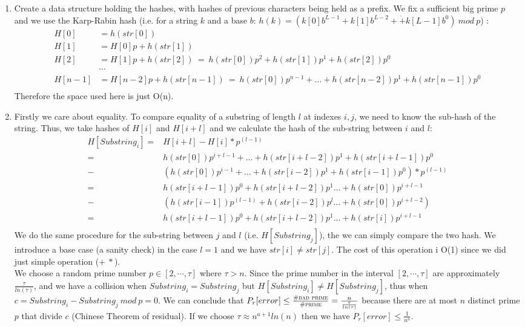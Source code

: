 \documentclass[a4paper]{article}
\begin{document}
\begin{enumerate}
\item Create a data structure holding the hashes, with hashes of previous characters being held as a prefix. We fix a sufficient big prime $p$ and we use the Karp-Rabin hash (i.e. for a string $k$ and a base $b$: $h(k) = (k[0]b^{L−1} + k[1]b^{L−2}+ \dot+ k [L − 1]b^0) \ mod\  p $) :
\begin{align*}
        H[0]&   = h(str[0]) \\
        H[1]&   = H[0]  p + h(str[1])\\
        H[2]&   = H[1]  p + h(str[2]) \ = \ h(str[0]) p^2 + h(str[1]) p^1 +h(str[2])p^0\\
        &\cdots  \\
        H[n-1]& = H[n-2]  p + h(str[n-1]) \ = \  h(str[0]) p^{n-1} +  \dots  +h(str[n-2]) p^1 + h(str[n-1])p^0\\ 
\end{align*}
Therefore the space used here is just O(n).
\item Firstly we care about equality. To compare equality of a substring of length $l$ at indexes $i, j$, we need to know the sub-hash of the string. Thus, we take hashes of $H[i]$ and $H[i+l]$ and we calculate the hash of the sub-string between $i$ and $l$:
\begin{align*}
H[Substring_i] = &H[i + l] - H[i] * p ^{(l - 1)}\\
=&h(str[0]) p^{i + l-1} +  \dots  +h(str[i + l-2]) p^1 + h(str[i + l-1])p^0\\
-& (h(str[0]) p^{i-1} +  \dots  +h(str[i-2]) p^1 + h(str[i-1])p^0)* p ^{(l - 1)}\\
=& h(str[i + l-1])p^0+h(str[i + l-2]) p^1\dots +h(str[0]) p^{i + l-1}  \\
-& (h(str[i-1])p^{(l - 1)} +h(str[i-2]) p^{l}\dots +h(str[0]) p^{i+l - 2}    )\\
=& h(str[i + l-1])p^0+h(str[i + l-2]) p^1\dots +h(str[i]) p^{i + l-1}  \\   
\end{align*}
We do the same procedure for the sub-string between $j$ and $l$ (i.e. $H[Substring_j]$), the we can simply compare the two hash. We introduce a base case (a sanity check) in the case $l=1$ and we have $str[i] \neq str[j]$. The cost of this operation i O(1) since we did just simple operation ($+ \ *$).\\
We choose a random prime number $p\in [2,\cdots,\tau]$ where $\tau > n$. Since the prime number in the interval $[2,\cdots,\tau]$ are approximately $ \frac{\tau}{ln(\tau)}$, and we have a collision when $Substring_i=Substring_j$ but $H[Substring_i]\neq H[Substring_j]$, thus when $c= Substring_i- Substring_j \ mod \ p=0$. We can conclude that $P_r[error] \leq \frac{\textsc{\#bad prime}}{\textsc{\#prime}}= \frac{n}{\frac{\tau}{ln(\tau)}}$ because there are at most $n$ distinct prime $p$ that divide $c$ (Chinese Theorem of residual). If we choose $\tau \approx n^{a+1} ln(n)$ then we have $P_r[error] \leq \frac{1}{n^a}$.

\end{enumerate}
\end{document}
